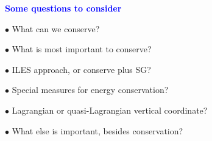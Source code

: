 \documentclass[a4]{seminar}
\newcommand{\B}[1]{\textcolor{blue}{#1}}
\begin{document}

\begin{slide}

\B{\bf Some questions to consider}

\( \bullet \) What can we conserve?

\( \bullet \) What is most important to conserve?

\( \bullet \) ILES approach, or conserve plus SG?

\( \bullet \) Special measures for energy conservation?

\( \bullet \) Lagrangian or quasi-Lagrangian vertical coordinate?

\( \bullet \) What else is important, besides conservation?


\vspace{2mm}


\end{slide}





\end{document}
